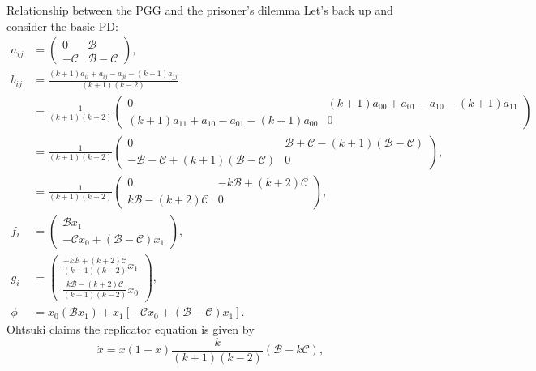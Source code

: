 \documentclass[13pt]{amsart}
\newcommand{\B}{\mathcal{B}}
\newcommand{\C}{\mathcal{C}}
\begin{document}
\begin{section}{Relationship between the PGG and the prisoner's dilemma}
Let's back up and consider the basic PD:
\begin{equation}
    \begin{split}
        a_{ij} & =
        \begin{pmatrix}
            0 & \B \\
            - \C & \B - \C
        \end{pmatrix},
        \\
        b_{ij} & =
        \frac{(k+1)a_{ii} + a_{ij} - a_{ji} - (k+1)a_{jj}}{(k+1)(k-2)}
        \\
        & = \frac{1}{(k+1)(k-2)}
        \begin{pmatrix}
            0 & (k+1)a_{00} + a_{01} - a_{10} - (k+1)a_{11} \\
            (k+1)a_{11} + a_{10} - a_{01} - (k+1)a_{00} & 0
        \end{pmatrix}
        \\
        & = \frac{1}{(k+1)(k-2)}
        \begin{pmatrix}
            0 & \B + \C - (k+1)(\B - \C) \\
            - \B - \C + (k+1)(\B - \C) & 0
        \end{pmatrix},
        \\
        & = \frac{1}{(k+1)(k-2)}
        \begin{pmatrix}
            0 & -k \B + (k+2) \C \\
            k \B - (k+2) \C & 0
        \end{pmatrix},
        \\
        f_i & =
        \begin{pmatrix}
            \B x_1 \\
            - \C x_0 + (\B - \C) x_1
        \end{pmatrix},
        \\
        g_i & =
        \begin{pmatrix}
            \frac{-k \B + (k+2) \C}{(k+1)(k-2)} x_1 \\
            \frac{k \B - (k+2) \C}{(k+1)(k-2)} x_0
        \end{pmatrix},
        \\
        \phi & = x_0 (\B x_1) + x_1 [-\C x_0 + (\B - \C) x_1].
    \end{split}
\end{equation}
Ohtsuki claims the replicator equation is given by
\begin{equation}
    \dot{x} = x(1-x)\frac{k}{(k+1)(k-2)}(\B - k\C),
\end{equation}

\end{section}
\end{document}
